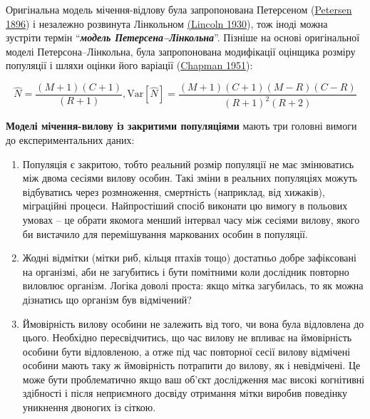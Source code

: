 \documentclass[
  11pt,
]{book}
\begin{document}
Оригінальна модель мічення-відлову була запропонована Петерсеном (\href{https://oa.mg/work/3196330325}{Petersen 1896}) і незалежно розвинута Лінкольном \href{https://books.google.com/books/about/Calculating_Waterfowl_Abundance_on_the_B.html?id=w4n_MQEACAAJ}{(Lincoln 1930}), тож іноді можна зустріти термін ``\textbf{\emph{модель Петерсена--Лінкольна}}''. Пізніше на основі оригінальної моделі Петерсона--Лінкольна, була запропонована модифікації оцінщика розміру популяції і шляхи оцінки його варіації (\href{https://search.worldcat.org/title/5269176}{Chapman 1951}):

\[\hat{N} = \frac{(M+1)(C + 1)}{(R+1)}, \text{Var}[\hat{N}] = \frac{(M+1)(C+1)(M-R)(C-R)}{(R+1)^2 (R+2)}\]

\textbf{Моделі мічення-вилову із закритими популяціями} мають три головні вимоги до експериментальних даних:

\begin{enumerate}
\def\labelenumi{\arabic{enumi}.}
\item
  Популяція є закритою, тобто реальний розмір популяції не має змінюватись між двома сесіями вилову особин. Такі зміни в реальних популяціях можуть відбуватись через розмноження, смертність (наприклад, від хижаків), міграційні процеси. Найпростіший спосіб виконати цю вимогу в польових умовах -- це обрати якомога менший інтервал часу між сесіями вилову, якого би вистачило для перемішування маркованих особин в популяції.
\item
  Жодні відмітки (мітки риб, кільця птахів тощо) достатньо добре зафіксовані на організмі, аби не загубитись і бути помітними коли дослідник повторно виловлює організм. Логіка доволі проста: якщо мітка загубилась, то як можна дізнатись що організм був відмічений?
\item
  Ймовірність вилову особини не залежить від того, чи вона була відловлена до цього. Необхідно пересвідчитись, що час вилову не впливає на ймовірність особини бути відловленою, а отже під час повторної сесії вилову відмічені особини мають таку ж ймовірність потрапити до вилову, як і невідмічені. Це може бути проблематично якщо ваш об'єкт дослідження має високі когнітивні здібності і після неприємного досвіду отримання мітки виробив поведінку уникнення двоногих із сіткою.
\end{enumerate}
\end{document}
